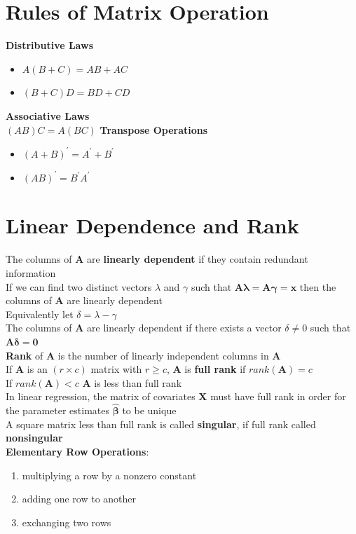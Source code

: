 \documentclass[openany]{book}
\newcommand{\lm}{\lambda}
\newcommand{\hb}{\hat{\beta}}
\newcommand{\bmx}{\bm{X}}
\newcommand{\bma}{\bm{A}}
\numberwithin{equation}{section}
\begin{document}
\begin{flushleft}
\section{Rules of Matrix Operation}
\textbf{Distributive Laws}\\
\begin{itemize}
\item $A(B+C)=AB+AC$
\item $(B+C)D=BD+CD$
\end{itemize}
\textbf{Associative Laws}\\
$(AB)C=A(BC)$
\textbf{Transpose Operations}\\
\begin{itemize}
\item $(A+B)^{'}=A^{'}+B^{'}$
\item $(AB)^{'}=B^{'}A^{'}$
\end{itemize}
\section{Linear Dependence and Rank}
The columns of $\bm{A}$ are \textbf{linearly dependent} if they contain redundant information\\
If we can find two distinct vectors $\lambda$ and $\gamma$
such that $\bm{A\lm}=\bm{A\gamma}=\bm{x}$ then the columns of $\bm{A}$ are linearly dependent\\
Equivalently let $\delta=\lm-\gamma$\\
The columns of $\bm{A}$ are linearly dependent if there exists a vector $\delta\neq 0$ such that $\bm{A\delta}=\bm{0}$\\
\textbf{Rank} of $\bm{A}$ is the number of linearly independent columns in $\bm{A}$\\
If $\bm{A}$ is an $(r\times c)$ matrix with $r\geq c$, $\bm{A}$ is \textbf{full rank} if $rank(\bm{A})=c$\\
If $rank(\bm{A})<c$ $\bma$ is less than full rank\\
In linear regression, the matrix of covariates $\bmx$ must have full rank in order for the parameter estimates $\bm{\hb}$ to be unique\\
A square matrix less than full rank is called \textbf{singular}, if full rank called \textbf{nonsingular}\\
\textbf{Elementary Row Operations}:
\begin{enumerate}
\item multiplying a row by a nonzero constant
\item adding one row to another
\item exchanging two rows
\end{enumerate}

\end{flushleft}
\end{document}
